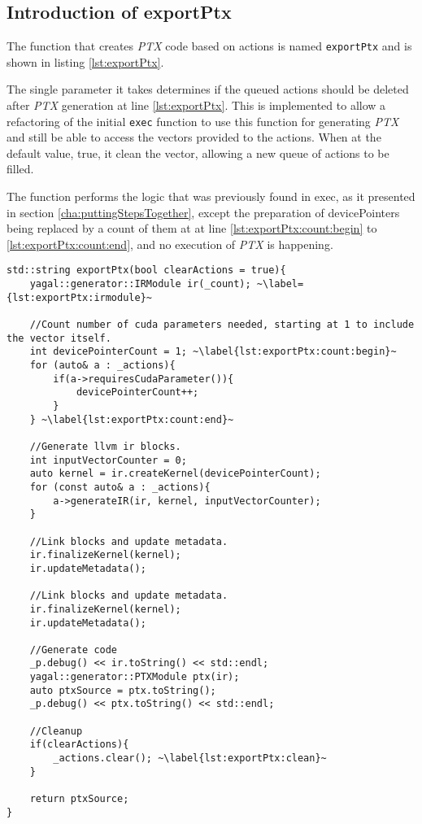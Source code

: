 \subsection{Introduction of exportPtx}
The function that creates \textit{PTX} code based on actions is named \texttt{exportPtx} and is shown in listing \ref{lst:exportPtx}.

The single parameter it takes determines if the queued actions should be deleted after \textit{PTX} generation at line \ref{lst:exportPtx}. This is implemented to allow a refactoring of the initial \texttt{exec} function to use this function for generating \textit{PTX} and still be able to access the vectors provided to the actions. When at the default value, true, it clean the vector, allowing a new queue of actions to be filled.

The function performs the logic that was previously found in exec, as it presented in section \ref{cha:puttingStepsTogether}, except the preparation of devicePointers being replaced by a count of them at at line \ref{lst:exportPtx:count:begin} to \ref{lst:exportPtx:count:end}, and no execution of \textit{PTX} is happening.

\begin{lstlisting}[caption={\texttt{exportPtx} to build \textit{PTX} code.}, label={lst:exportPtx}]
std::string exportPtx(bool clearActions = true){
    yagal::generator::IRModule ir(_count); ~\label={lst:exportPtx:irmodule}~

    //Count number of cuda parameters needed, starting at 1 to include the vector itself.
    int devicePointerCount = 1; ~\label{lst:exportPtx:count:begin}~
    for (auto& a : _actions){
        if(a->requiresCudaParameter()){
            devicePointerCount++;
        }
    } ~\label{lst:exportPtx:count:end}~

    //Generate llvm ir blocks.
    int inputVectorCounter = 0;
    auto kernel = ir.createKernel(devicePointerCount);
    for (const auto& a : _actions){
        a->generateIR(ir, kernel, inputVectorCounter);
    }

    //Link blocks and update metadata.
    ir.finalizeKernel(kernel);
    ir.updateMetadata();

    //Link blocks and update metadata.
    ir.finalizeKernel(kernel);
    ir.updateMetadata();

    //Generate code
    _p.debug() << ir.toString() << std::endl;
    yagal::generator::PTXModule ptx(ir);
    auto ptxSource = ptx.toString();
    _p.debug() << ptx.toString() << std::endl;

    //Cleanup
    if(clearActions){
        _actions.clear(); ~\label{lst:exportPtx:clean}~
    }

    return ptxSource;
}
\end{lstlisting}

